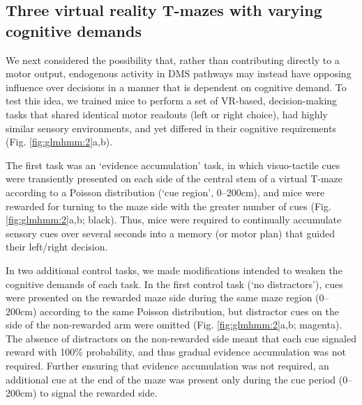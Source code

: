 \subsection{Three virtual reality T-mazes with varying cognitive demands}
\label{sec:glmhmm:2.2.3}
We next considered the possibility that, rather than contributing directly to a motor output, endogenous activity in DMS pathways may instead have opposing influence over decisions in a manner that is dependent on cognitive demand. To test this idea, we trained mice to perform a set of VR-based, decision-making tasks \cite{pinto_accumulation--evidence_2018} that shared identical motor readouts (left or right choice), had highly similar sensory environments, and yet differed in their cognitive requirements (Fig. \ref{fig:glmhmm:2}a,b).

The first task was an ‘evidence accumulation’ task, in which visuo-tactile cues were transiently presented on each side of the central stem of a virtual T-maze according to a Poisson distribution (‘cue region’, 0–200cm), and mice were rewarded for turning to the maze side with the greater number of cues (Fig. \ref{fig:glmhmm:2}a,b; black). Thus, mice were required to continually accumulate sensory cues over several seconds into a memory (or motor plan) that guided their left/right decision.

In two additional control tasks, we made modifications intended to weaken the cognitive demands of each task. In the first control task (‘no distractors’), cues were presented on the rewarded maze side during the same maze region (0–200cm) according to the same Poisson distribution, but distractor cues on the side of the non-rewarded arm were omitted (Fig. \ref{fig:glmhmm:2}a,b; magenta). The absence of distractors on the non-rewarded side meant that each cue signaled reward with 100\% probability, and thus gradual evidence accumulation was not required. Further ensuring that evidence accumulation was not required, an additional cue at the end of the maze was present only during the cue period (0–200cm) to signal the rewarded side.

